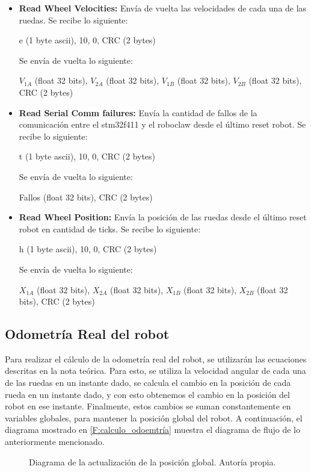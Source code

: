\begin{itemize}
\item \textbf{Read Wheel Velocities:} Envía de vuelta las velocidades de cada una de las ruedas. Se recibe lo siguiente:

e (1 byte ascii), 10, 0, CRC (2 bytes)

Se envía de vuelta lo siguiente:

$V_{1A}$ (float 32 bits), $V_{2A}$ (float 32 bits), $V_{1B}$ (float 32 bits), $V_{2B}$ (float 32 bits), CRC (2 bytes)

\item \textbf{Read Serial Comm failures:} Envía la cantidad de fallos de la comunicación entre el stm32f411 y el roboclaw desde el último reset robot. Se recibe lo siguiente:

t (1 byte ascii), 10, 0, CRC (2 bytes)

Se envía de vuelta lo siguiente:

Fallos (float 32 bits), CRC (2 bytes)

\item \textbf{Read Wheel Position:} Envía la posición de las ruedas desde el último reset robot en cantidad de ticks. Se recibe lo siguiente:

h (1 byte ascii), 10, 0, CRC (2 bytes)

Se envía de vuelta lo siguiente:

$X_{1A}$ (float 32 bits), $X_{2A}$ (float 32 bits), $X_{1B}$ (float 32 bits), $X_{2B}$ (float 32 bits), CRC (2 bytes)

\end{itemize}

\subsection{Odometría Real del robot}

Para realizar el cálculo de la odometría real del robot, se utilizarán las ecuaciones descritas en la nota teórica. Para esto, se utiliza la velocidad angular de cada una de las ruedas en un instante dado, se calcula el cambio en la posición de cada rueda en un instante dado, y con esto obtenemos el cambio en la posición del robot en ese instante. Finalmente, estos cambios se suman constantemente en variables globales, para mantener la posición global del robot. A continuación, el diagrama mostrado en \ref{F:calculo_odoemtría} muestra el diagrama de flujo de lo anteriormente mencionado.

\begin{figure}[H]
\centering

\caption{Diagrama de la actualización de la posición global. Autoría propia.}
\label{F:calculo_odometria}
\end{figure}

